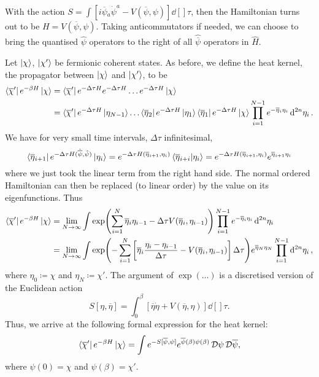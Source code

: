 With the action $S = \int \left[ i \overline{\psi}{}_a \dot{\psi}^a - V(\overline{\psi}{}, \psi) \right] \dd[]{\tau}$, then the Hamiltonian turns out to be $H = V(\overline{\psi}{}, \psi)$. 
Taking anticommutators if needed, we can choose to bring the quantised $\hat{\psi}$ operators to the right of all $\hat{\overline{\psi}{}}$ operators in $\hat{H}$.

Let $\ket{\chi}$, $\ket{\chi'}$ be fermionic coherent states. As before, we define the heat kernel, the propagator between $\ket{\chi}$ and $\ket{\chi'}$, to be 
\begin{align}
  \bra{\overline{\chi}{}'} e^{-\beta H} \ket{\chi} &= \bra{\overline{\chi}{}'} e^{- \Delta \tau H} e^{- \Delta \tau H} \dots e^{- \Delta \tau H} \ket{\chi} \\
  &= \bra{\overline{\chi}{}'} e^{-\Delta \tau H} \ket{\eta_{N-1}} \dots \bra{\overline{\eta}{}_2} e^{-\Delta \tau H} \ket{\eta_1} \bra{\overline{\eta}{}_1} e^{- \Delta \tau H} \ket{\chi} \prod_{i = 1}^{N-1} e^{- \overline{\eta}{}_i \eta_i} \dd[2n]{\eta_i}.
\end{align}
We have for very small time intervals, $\Delta \tau$ infinitesimal, 
\begin{equation}
  \bra{\overline{\eta}{}_{i+1}} e^{- \Delta \tau H (\hat{\overline{\psi}{}}, \hat{\psi})} \ket{\eta_{i}} = e^{-\Delta \tau H(\overline{\eta}{}_{i + 1}, \eta_i)} \bra{\overline{\eta}{}_{i + i}} \ket{\eta_i} = e^{-\Delta \tau H(\overline{\eta}{}_{i+1}, \eta_i)} e^{\overline{\eta}{}_{i + 1} \eta_i}
\end{equation}
where we just took the linear term from the right hand side. The normal ordered Hamiltonian can then be replaced (to linear order) by the value on its eigenfunctions.
Thus 
\begin{align}
  \bra{\overline{\chi}{}'} e^{- \beta H} \ket{\chi} &= \lim_{N \to \infty} \int \exp(\sum_{i=1}^{N} \overline{\eta}{}_i \eta_{i-1} - \Delta \tau V(\overline{\eta}{}_i, \eta_{i-1}))
  \prod_{i = 1}^{N-1} e^{- \overline{\eta}{}_i \eta_i} \dd[2n]{\eta_i} \\
				       &= \lim_{N \to \infty}  \int \exp(-\sum_{i=1}^{N} \left[ \overline{\eta}{}_i \frac{\eta_i - \eta_{i-1}}{\Delta \tau} - V(\overline{\eta}{}_i, \eta_{i-1}) \right]\Delta \tau) e^{\overline{\eta}{}_N \eta_N} \prod_{i = 1}^{N-1} \dd[2n]{\eta_i},
\end{align}
where $\eta_0 \coloneqq \chi$ and $\eta_N \coloneqq\chi'$. The argument of $\exp(\dots)$ is a discretised version of the Euclidean action
\begin{equation}
  S[\eta, \overline{\eta}{}] = \int_0^{\beta} \left[ \overline{\eta}{} \dot{\eta} + V(\overline{\eta}{}, \eta) \right] \dd[]{\tau}.
\end{equation}
Thus, we arrive at the following formal expression for the heat kernel:
\begin{equation}
  \bra{\overline{\chi}{}'} e^{-\beta H} \ket{\chi} = \int e^{-S[\overline{\psi}{}, \psi]} e^{\overline{\psi}{}(\beta) \psi(\beta)} \mathop{\mathcal{D} \psi} \mathop{\mathcal{D} \overline{\psi}{}},
\end{equation}
where $\psi(0) = \chi$  and $\psi(\beta) = \chi'$.

